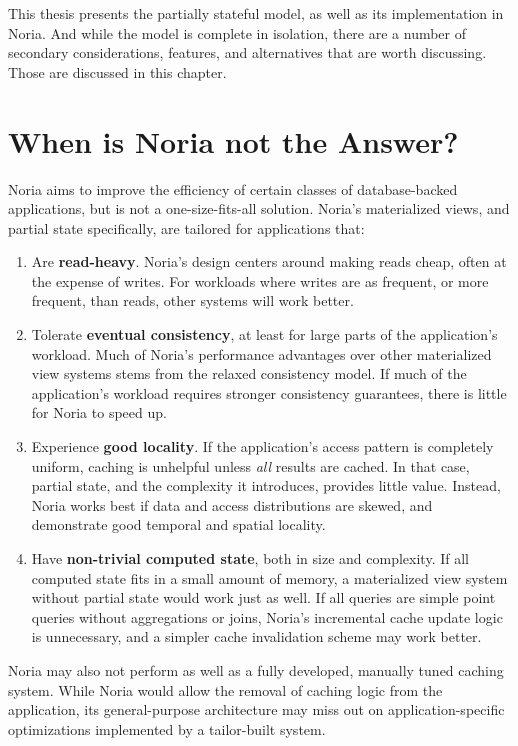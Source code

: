 This thesis presents the partially stateful model, as well as its implementation
in Noria. And while the model is complete in isolation, there are a number of
secondary considerations, features, and alternatives that are worth discussing.
Those are discussed in this chapter.

\section{When is Noria not the Answer?}

Noria aims to improve the efficiency of certain classes of database-backed
applications, but is not a one-size-fits-all solution. Noria's materialized
views, and partial state specifically, are tailored for applications that:

\begin{enumerate}
  \item Are \textbf{read-heavy}. Noria's design centers around making reads
    cheap, often at the expense of writes. For workloads where writes are as
    frequent, or more frequent, than reads, other systems will work better.
  \item Tolerate \textbf{eventual consistency}, at least for large parts of the
    application's workload. Much of Noria's performance advantages over other
    materialized view systems stems from the relaxed consistency model. If much
    of the application's workload requires stronger consistency guarantees,
    there is little for Noria to speed up.
  \item Experience \textbf{good locality}. If the application's access pattern
    is completely uniform, caching is unhelpful unless \emph{all} results are
    cached. In that case, partial state, and the complexity it introduces,
    provides little value. Instead, Noria works best if data and access
    distributions are skewed, and demonstrate good temporal and spatial
    locality.
  \item Have \textbf{non-trivial computed state}, both in size and complexity.
    If all computed state fits in a small amount of memory, a materialized view
    system without partial state would work just as well. If all queries are
    simple point queries without aggregations or joins, Noria's incremental
    cache update logic is unnecessary, and a simpler cache invalidation scheme
    may work better.
\end{enumerate}

Noria may also not perform as well as a fully developed, manually tuned caching
system. While Noria would allow the removal of caching logic from the
application, its general-purpose architecture may miss out on
application-specific optimizations implemented by a tailor-built system.

